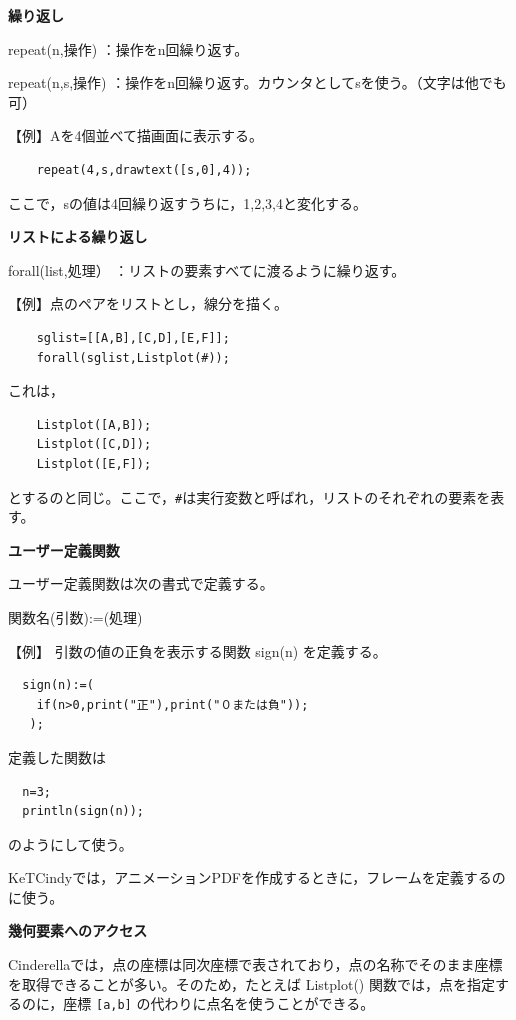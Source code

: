 \documentclass[papersize,a4paper,12pt,uplatex]{jsarticle}
\begin{document}
\vspace{\baselineskip}
{\bf 繰り返し}

repeat(n,操作)    ：操作をn回繰り返す。

repeat(n,s,操作)  ：操作をn回繰り返す。カウンタとしてsを使う。（文字は他でも可）

\vspace{\baselineskip}
  【例】Aを4個並べて描画面に表示する。
\begin{verbatim}
    repeat(4,s,drawtext([s,0],4));
\end{verbatim}
  ここで，sの値は4回繰り返すうちに，1,2,3,4と変化する。

\vspace{\baselineskip}
{\bf リストによる繰り返し}

  forall(list,処理）  ：リストの要素すべてに渡るように繰り返す。
  
\vspace{\baselineskip}
  【例】点のペアをリストとし，線分を描く。
\begin{verbatim}
    sglist=[[A,B],[C,D],[E,F]];
    forall(sglist,Listplot(#));
\end{verbatim}
  これは，
\begin{verbatim}
    Listplot([A,B]);
    Listplot([C,D]);
    Listplot([E,F]);
\end{verbatim}
とするのと同じ。ここで，\verb|#|は実行変数と呼ばれ，リストのそれぞれの要素を表す。

\vspace{\baselineskip}
{\bf ユーザー定義関数}

ユーザー定義関数は次の書式で定義する。

\hspace{10mm}関数名(引数):=(処理)

\vspace{\baselineskip}
【例】  引数の値の正負を表示する関数 sign(n) を定義する。
\begin{verbatim}
  sign(n):=(
    if(n>0,print("正"),print("０または負"));
   );
\end{verbatim}
定義した関数は
\begin{verbatim}
  n=3;
  println(sign(n));
\end{verbatim}
のようにして使う。

KeTCindyでは，アニメーションPDFを作成するときに，フレームを定義するのに使う。

\vspace{\baselineskip}
{\bf 幾何要素へのアクセス}

Cinderellaでは，点の座標は同次座標で表されており，点の名称でそのまま座標を取得できることが多い。そのため，たとえば Listplot() 関数では，点を指定するのに，座標 \verb|[a,b]| の代わりに点名を使うことができる。
\end{document}

